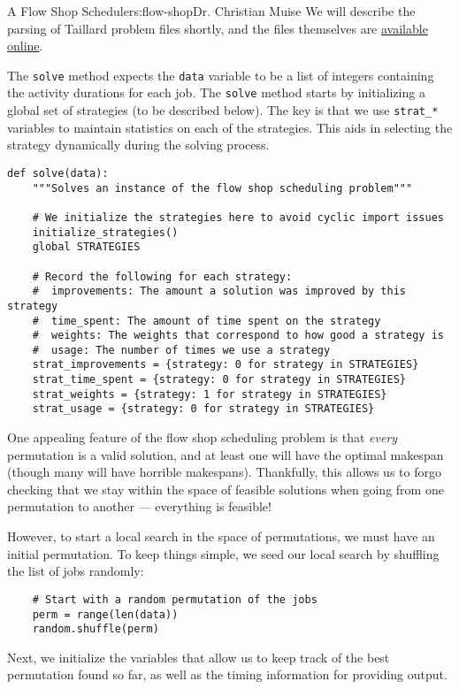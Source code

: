 \begin{aosachapter}{A Flow Shop Scheduler}{s:flow-shop}{Dr. Christian Muise}
We will describe the parsing of Taillard problem files shortly, and the
files themselves are
\href{http://mistic.heig-vd.ch/taillard/problemes.dir/ordonnancement.dir/ordonnancement.html}{available
online}.

The \texttt{solve} method expects the \texttt{data} variable to be a
list of integers containing the activity durations for each job. The
\texttt{solve} method starts by initializing a global set of strategies
(to be described below). The key is that we use \texttt{strat\_*}
variables to maintain statistics on each of the strategies. This aids in
selecting the strategy dynamically during the solving process.

\begin{verbatim}
def solve(data):
    """Solves an instance of the flow shop scheduling problem"""

    # We initialize the strategies here to avoid cyclic import issues
    initialize_strategies()
    global STRATEGIES

    # Record the following for each strategy:
    #  improvements: The amount a solution was improved by this strategy
    #  time_spent: The amount of time spent on the strategy
    #  weights: The weights that correspond to how good a strategy is
    #  usage: The number of times we use a strategy
    strat_improvements = {strategy: 0 for strategy in STRATEGIES}
    strat_time_spent = {strategy: 0 for strategy in STRATEGIES}
    strat_weights = {strategy: 1 for strategy in STRATEGIES}
    strat_usage = {strategy: 0 for strategy in STRATEGIES}
\end{verbatim}

One appealing feature of the flow shop scheduling problem is that
\emph{every} permutation is a valid solution, and at least one will have
the optimal makespan (though many will have horrible makespans).
Thankfully, this allows us to forgo checking that we stay within the
space of feasible solutions when going from one permutation to another
--- everything is feasible!

However, to start a local search in the space of permutations, we must
have an initial permutation. To keep things simple, we seed our local
search by shuffling the list of jobs randomly:

\begin{verbatim}
    # Start with a random permutation of the jobs
    perm = range(len(data))
    random.shuffle(perm)
\end{verbatim}

Next, we initialize the variables that allow us to keep track of the
best permutation found so far, as well as the timing information for
providing output.


\end{aosachapter}
